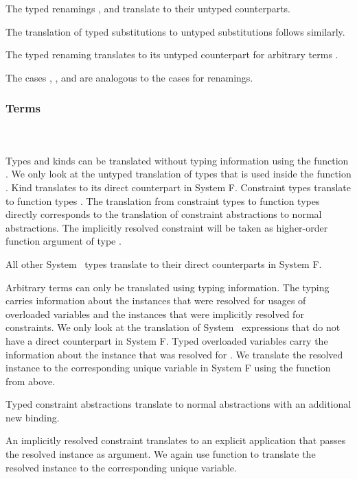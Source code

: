 \noindent The typed renamings ,  and  translate to their untyped counterparts. 

\noindent The translation of typed substitutions to untyped substitutions follows similarly.
\DPTSub 

\noindent The typed renaming  translates to its untyped counterpart for arbitrary terms .

\noindent The cases , ,  and  are analogous to the cases for renamings. 

\subsubsection{Terms}\hfill\\\\
Types and kinds can be translated without typing information using the function .  
We only look at the untyped translation of types  that is used inside the function . Kind  translates to its direct counterpart in System F.
\DPTType
Constraint types \Constr{[}  \Constr{:}  \Constr{]⇒}  translate to function types   . 
The translation from constraint types to function types directly corresponds to the translation of constraint abstractions to normal abstractions. 
The implicitly resolved constraint will be taken as higher-order function argument of type .

\noindent All other System \Fo\ types translate to their direct counterparts in System F.

\noindent Arbitrary terms can only be translated using typing information.
The typing carries information about the instances that were resolved for usages of overloaded variables and the instances that were implicitly resolved for constraints. 
We only look at the translation of System \Fo\ expressions that do not have a direct counterpart in System F.
\DPTTerms
Typed overloaded variables  carry the information  about the instance that was resolved for .
We translate the resolved instance to the corresponding unique variable in System F using the  function from above.

\noindent Typed constraint abstractions  translate to normal abstractions with an additional new binding. 

\noindent An implicitly resolved constraint  translates to an explicit application that passes the resolved instance as argument. We again use function  to translate the resolved instance  to the corresponding unique variable. 

